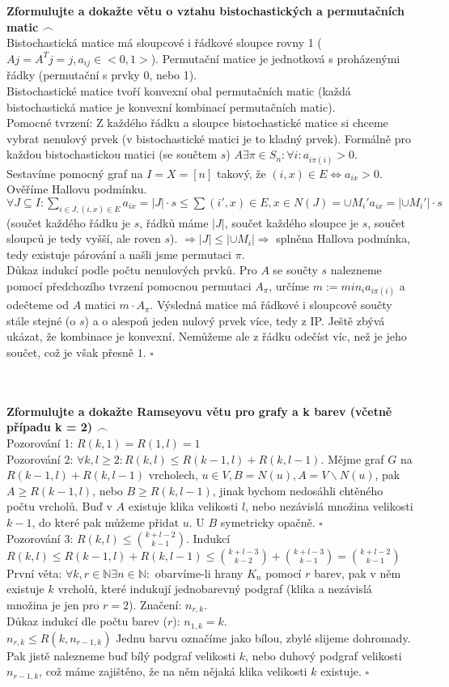 \documentclass[a4paper]{article}
\newcommand{\fr}{$\frown$}
\newcommand{\led}{\hspace{0.2cm}$\square$}
\newcommand{\hlava}[1]{\text{} \\ \text{} \\ \text{} \hspace{-0.27cm} \textbf{#1} \\}
\begin{document}
\hlava{Zformulujte a dokažte větu o vztahu bistochastických a permutačních matic \fr}
Bistochastická matice má sloupcové i řádkové sloupce rovny 1 ($Aj = A^Tj = j, a_{ij} \in <0,1>$). Permutační matice je jednotková s proházenými řádky (permutační s prvky 0, nebo 1). \\
Bistochastické matice tvoří konvexní obal permutačních matic (každá bistochastická matice je konvexní kombinací permutačních matic). \\
Pomocné tvrzení: Z každého řádku a sloupce bistochastické matice si chceme vybrat nenulový prvek (v bistochastické matici je to kladný prvek). Formálně pro každou bistochastickou matici (se součtem $s$) $A \exists \pi \in S_n: \forall i: a_{i \pi(i)} > 0$. \\
Sestavíme pomocný graf na $I= X = [n]$ takový, že $(i,x) \in E \Leftrightarrow a_{ix} >0$. Ověříme Hallovu podmínku. $\forall J \subseteq I: \sum_{i \in J, (i,x) \in E} a_{ix} = |J|\cdot s \le \sum{(i', x) \in E, x \in N(J)=\cup M_i'} a_{ix} = |\cup M_i'|\cdot s$ (součet každého řádku je $s$, řádků máme $|J|$, součet každého sloupce je $s$, součet sloupců je tedy vyšší, ale roven $s$). $\Rightarrow |J| \le |\cup M_i| \Rightarrow$ splněna Hallova podmínka, tedy existuje párování a našli jsme permutaci $\pi$. \\
Důkaz indukcí podle počtu nenulových prvků. Pro $A$ se součty $s$ nalezneme pomocí předchozího tvrzení pomocnou permutaci $A_\pi$, určíme $m := min_i a_{i\pi(i)}$ a odečteme od $A$ matici $m\cdot A_\pi$. Výsledná matice má řádkové i sloupcové součty stále stejné (o $s$) a o alespoň jeden nulový prvek více, tedy z IP. Ještě zbývá ukázat, že kombinace je konvexní. Nemůžeme ale z řádku odečíst víc, než je jeho součet, což je však přesně $1$. \led

\hlava{Zformulujte a dokažte Ramseyovu větu pro grafy a k barev (včetně případu k = 2) \fr}
Pozorování 1: $R(k,1) = R(1,l) = 1$ \\
Pozorování 2: $\forall k, l \ge 2: R(k,l) \le R(k-1,l)+R(k,l-1)$. Mějme graf $G$ na $R(k-1,l)+R(k,l-1)$ vrcholech, $u \in V, B = N(u), A=V\backslash N(u)$, pak $A \ge R(k-1,l)$, nebo $B \ge R(k,l-1)$, jinak bychom nedosáhli chtěného počtu vrcholů. Buď v $A$ existuje klika velikosti $l$, nebo nezávislá množina velikosti $k-1$, do které pak můžeme přidat $u$. U $B$ symetricky opačně. \led \\
Pozorování 3: $R(k,l) \le { {k+l-2} \choose {k-1} }$. Indukcí $R(k,l) \le R(k-1,l) + R(k,l-1) \le { {k+l-3} \choose {k-2} } + { {k+l-3} \choose {k-1} }  = { {k+l-2} \choose {k-1} }$ \\
První věta: $\forall k,r \in \mathbb{N} \exists n \in \mathbb{N}: $ obarvíme-li hrany $K_n$ pomocí $r$ barev, pak v něm existuje $k$ vrcholů, které indukují jednobarevný podgraf (klika a nezávislá množina je jen pro $r=2$). Značení: $n_{r,k}$.\\
Důkaz indukcí dle počtu barev ($r$): $n_{1,k} = k$. \\ 
$n_{r, k} \le R(k, n_{r-1,k})$ Jednu barvu označíme jako bílou, zbylé slijeme dohromady. Pak jistě nalezneme buď bílý podgraf velikosti $k$, nebo duhový podgraf velikosti $n_{r-1,k}$, což máme zajištěno, že na něm nějaká klika velikosti $k$ existuje. \led
\end{document}
